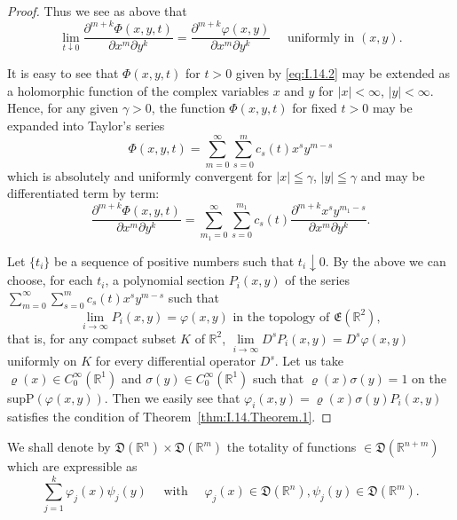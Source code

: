 \begin{proof}
Thus we see as above that 
\begin{equation}\label{eq:I.14.3}
\lim\limits_{t \downarrow 0} \frac {\partial^{m+k} \Phi (x , y , t)}{\partial x ^{m} \partial y ^{k}} = \frac {\partial^{m+k} \varphi (x , y)}{\partial x ^{m} \partial y ^{k}} \quad \text{ uniformly in } (x, y).
\end{equation}

It is easy to see that $\Phi(x, y, t)$ for $t > 0$ given by \eqref{eq:I.14.2} may be extended as a holomorphic function of the complex variables $x$ and $y$ for $|x| < \infty$, 
$|y|<\infty$. Hence, for any given $\gamma>0$, the function $\Phi(x,y,t)$ for fixed $t>0$ may be expanded into Taylor's series 
\[
\Phi (x, y, t) = \sum\limits_{m=0} ^{\infty} \sum\limits_{s=0} ^{m} c_{s} (t) x ^{s} y ^{m-s}
\]
which is absolutely and uniformly convergent for $|x| \leqq \gamma$, $|y| \leqq \gamma$ and may be differentiated term by term: 
\[
\frac {\partial^{m+k} \Phi (x , y , t)}{\partial x ^{m} \partial y ^{k}} = \sum\limits_ {m_{1} = 0} ^{\infty} \sum\limits_{s=0} ^ {m_{1}} c_{s} (t) \frac {\partial^{m+k} x ^{s} y ^ {m_{1}- s}}{\partial x ^{m} \partial y ^{k}}.
\]

Let $\{t_i\}$ be a sequence of positive numbers such that $t_i \downarrow 0$. By the above we can choose, for each $t_i$, a polynomial section $P_i(x, y)$ of the series $\sum\limits_{m=0}^{\infty} \sum\limits_{s=0}^{m} c_s(t) x^s y^{m-s}$ such that 
\[
\lim\limits_{i \to \infty} P_{i} (x, y) = \varphi (x, y) \text{ in the topology of } \mathfrak {E} (\mathbb{R}^{2}),
\]
that is, for any compact subset $K$ of $\mathbb{R}^{2}$, $\lim\limits_{i \to \infty} D^s P_i(x, y) = D^s \varphi(x, y)$ uniformly on $K$ for every differential operator $D^s$. Let us take $\varrho(x) \in C_0^\infty(\mathbb{R}^{1})$ and $\sigma(y) \in C_0^\infty(\mathbb{R}^{1})$ such that $\varrho(x) \sigma(y) = 1$ on the supP$(\varphi(x, y))$. Then we easily see that $\varphi_i(x, y) = \varrho(x) \sigma(y) P_i(x, y)$ satisfies the condition of Theorem~\ref{thm:I.14.Theorem.1}.
\end{proof}

\begin{remarku} We shall denote by $\mathfrak{D}(\mathbb{R}^{n}) \times \mathfrak{D}(\mathbb{R}^{m})$ the totality of functions $\in \mathfrak{D}(\mathbb{R}^{n+m})$ which are expressible as 
\[
\sum\limits_{j=1} ^{k} \varphi_{j} (x) \psi_{j} (y) \quad \text{ with } \quad \varphi_{j} (x) \in \mathfrak {D} (\mathbb{R}^{n}), \psi_{j} (y) \in \mathfrak {D} (\mathbb{R}^{m}).
\]
\end{remarku}

